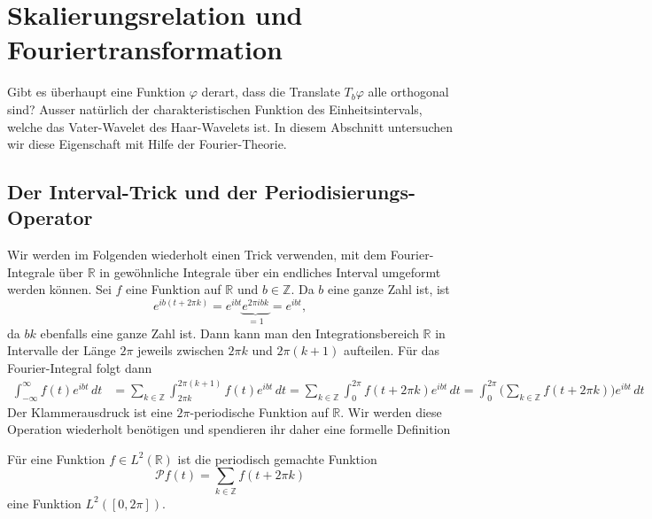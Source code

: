 %
%
%
\section{Skalierungsrelation und Fouriertransformation
\label{section:skalfour}}


Gibt es überhaupt eine Funktion $\varphi$ derart, dass die Translate
$T_b\varphi$ alle orthogonal sind?
Ausser natürlich der charakteristischen Funktion des Einheitsintervals,
welche das Vater-Wavelet des Haar-Wavelets ist.
In diesem Abschnitt untersuchen wir diese Eigenschaft mit Hilfe der 
Fourier-Theorie.

%
%
\subsection{Der Interval-Trick und der Periodisierungs-Operator}
Wir werden im Folgenden wiederholt einen Trick verwenden, mit dem
Fourier-Integrale über $\mathbb R$ in gewöhnliche Integrale
über ein endliches Interval umgeformt werden können.
Sei $f$ eine Funktion auf $\mathbb R$ und $b\in\mathbb Z$.
Da $b$ eine ganze Zahl ist, ist
\[
e^{ib(t+2\pi k)}
=
e^{ibt}\underbrace{e^{2\pi i bk}}_{\displaystyle = 1}
=
e^{ibt},
\]
da $bk$ ebenfalls eine ganze Zahl ist.
Dann kann man den Integrationsbereich $\mathbb R$ in Intervalle der
Länge $2\pi$ jeweils zwischen $2\pi k$ und $2\pi(k+1)$ aufteilen.
Für das Fourier-Integral folgt dann
\begin{align}
\int_{-\infty}^\infty f(t) e^{ibt}\,dt
&=
\sum_{k\in\mathbb Z} \int_{2\pi k}^{2\pi(k+1)} f(t) e^{ibt}\,dt
=
\sum_{k\in\mathbb Z} \int_{0}^{2\pi} f(t+2\pi k) e^{ibt}\,dt
=
\int_{0}^{2\pi} \biggl(\sum_{k\in\mathbb Z} f(t+2\pi k)\biggr) e^{ibt}\,dt
\label{msa:intervaltrick}
\end{align}
Der Klammerausdruck ist eine $2\pi$-periodische Funktion auf $\mathbb R$.
Wir werden diese Operation wiederholt benötigen und spendieren ihr daher
eine formelle Definition

\begin{definition}
Für eine Funktion $f\in L^2(\mathbb R)$ ist die periodisch gemachte Funktion
\[
\mathcal{P}f(t) = \sum_{k\in\mathbb Z} f(t+2\pi k)
\]
eine Funktion $L^2([0,2\pi])$.
\end{definition}


